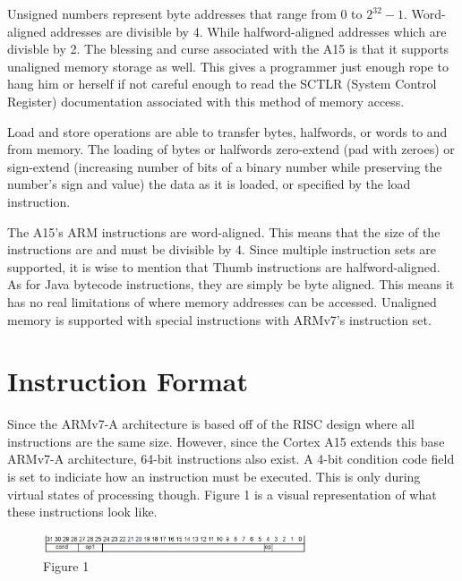 \documentclass[12pt]{scrreprt}
\begin{document}
	Unsigned numbers represent byte addresses that range from 0 to $2^{32}-1$.
	Word-aligned addresses are divisible by 4.
	While halfword-aligned addresses which are divisble by 2.
	The blessing and curse associated with the A15 is that it supports unaligned memory storage as well.
	This gives a programmer just enough rope to hang him or herself if not careful enough to read the SCTLR (System Control Register) documentation associated with this method of memory access.

	Load and store operations are able to transfer bytes, halfwords, or words to and from memory.
	The loading of bytes or halfwords zero-extend (pad with zeroes) or sign-extend (increasing number of bits of a binary number while preserving the number's sign and value) the data as it is loaded, or specified by the load instruction.

	The A15's ARM instructions are word-aligned.
	This means that the size of the instructions are and must be divisible by 4.
	Since multiple instruction sets are supported, it is wise to mention that Thumb instructions are halfword-aligned.
	As for Java bytecode instructions, they are simply be byte aligned.
	This means it has no real limitations of where memory addresses can be accessed.
	Unaligned memory is supported with special instructions with ARMv7's instruction set.

{\let\clearpage\relax\chapter{Instruction Format}}

	Since the ARMv7-A architecture is based off of the RISC design where all instructions are the same size.
	However, since the Cortex A15 extends this base ARMv7-A architecture, 64-bit instructions also exist.
	A 4-bit condition code field is set to indiciate how an instruction must be executed.
	This is only during virtual states of processing though.
	Figure 1 is a visual representation of what these instructions look like.
	
	\begin{figure}[h]
		\centering
			\includegraphics[width=0.7\textwidth]{croppedIE}
		\caption{Figure 1}
	\end{figure}
\end{document}
